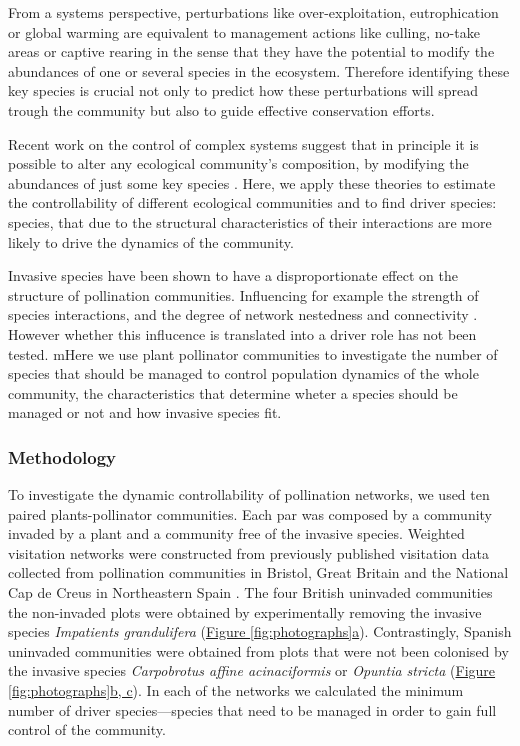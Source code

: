 \documentclass[a4paper]{article}
\begin{document}
From a systems perspective, perturbations like over-exploitation, eutrophication or global warming are equivalent to management actions like culling, no-take areas or captive rearing in the sense that they have the potential to modify the abundances of one or several species in the ecosystem. Therefore identifying these key species is crucial not only to predict how these perturbations will spread trough the community but also to guide effective conservation efforts.

Recent work on the control of complex systems suggest that in principle it is possible to alter any ecological community's composition, by modifying the abundances of just some key species \autocite{Isbell2013, Cornelius2013}. Here, we apply these theories to estimate the controllability of different ecological communities and to find driver species: species, that due to the structural characteristics of their interactions are more likely to drive the dynamics of the community.

Invasive species have been shown to have a disproportionate effect on the structure of pollination communities. Influencing for example the strength of species interactions, and the degree of network nestedness and connectivity \autocite{Olesen2002, Aizen2008, Bartomeus2008, Vila2009, Traveset2013}. However whether this influcence is translated into a driver role has not been tested. mHere we use plant pollinator communities to investigate the number of species that should be managed to control population dynamics of the whole community, the characteristics that determine wheter a species should be managed or not and how invasive species fit. 

\subsubsection*{Methodology} 

To investigate the dynamic controllability of pollination networks, we used ten paired plants-pollinator communities. Each par was composed by a community invaded by a plant and a community free of the invasive species. Weighted visitation networks were constructed from previously published visitation data collected from pollination communities in Bristol, Great Britain \autocite{Lopezaraiza-Mikel2007} and the National Cap de Creus in Northeastern Spain \autocite{Bartomeus2008}. The four British uninvaded communities the non-invaded plots were obtained by experimentally removing the invasive species \textit{Impatients grandulifera} (\hyperref[fig:photographs]{Figure \ref{fig:photographs}a}). Contrastingly, Spanish uninvaded communities were obtained from plots that were not been colonised by the invasive species \textit{Carpobrotus affine acinaciformis} or \textit{Opuntia stricta} (\hyperref[fig:photographs]{Figure \ref{fig:photographs}b, c}). In each of the networks we calculated the minimum number of driver species---species that need to be managed in order to gain full control of the community.
\end{document}
